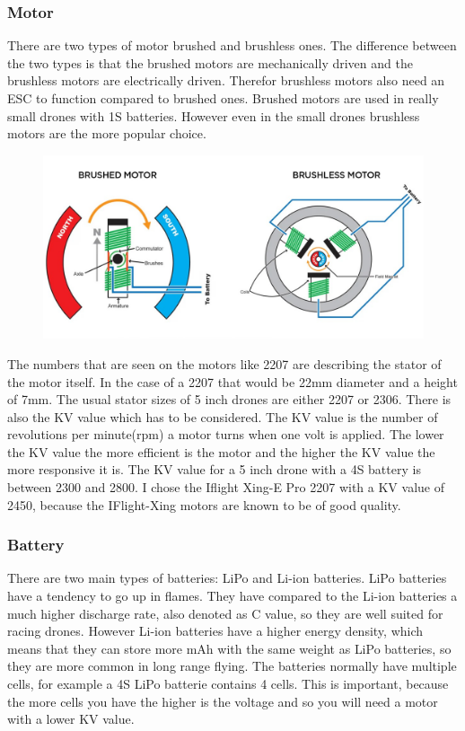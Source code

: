 \documentclass{article}
\begin{document}
	\subsubsection{Motor}
	There are two types of motor brushed and brushless ones. The difference between the two types is that the brushed motors are mechanically driven and the brushless motors are electrically driven. Therefor brushless motors also need an ESC to function compared to brushed ones. Brushed motors are used in really small drones with 1S batteries. However even in the small drones brushless motors are the more popular choice\cite{brush/lessmotors}. 
\begin{figure}[h]
	\centering
	\includegraphics[scale=0.2]{pictures/motor}
	\caption{\cite{picturemotor}}
	\label{fig:motor}
\end{figure}

	The numbers that are seen on the motors like 2207 are describing the stator of the motor itself. In the case of a 2207 that would be 22mm diameter and a height of 7mm. The usual stator sizes of 5 inch drones are either 2207 or 2306. There is also the KV value which has to be considered. The KV value is the number of revolutions per minute(rpm) a motor turns when one volt is applied. The lower the KV value the more efficient is the motor and the higher the KV value the more responsive it is. The KV value for a 5 inch drone with a 4S battery is between 2300 and 2800. I chose the Iflight Xing-E Pro 2207\cite{xingepro} with a KV value of 2450, because the IFlight-Xing motors are known to be of good quality. 


	
	\subsubsection{Battery}
	There are two main types of batteries: \gls{LiPo} and \gls{Li-ion} batteries. \gls{LiPo} batteries have a tendency to go up in flames. They have compared to the \gls{Li-ion} batteries a much higher discharge rate, also denoted as C value, so they are well suited for racing drones. However \gls{Li-ion} batteries have a higher energy density, which means that they can store more mAh with the same weight as \gls{LiPo} batteries, so they are more common in long range flying. The batteries normally have multiple cells, for example a 4S \gls{LiPo} batterie contains 4 cells. This is important, because the more cells you have the higher is the voltage and so you will need a motor with a lower KV value. 
	
\end{document}
